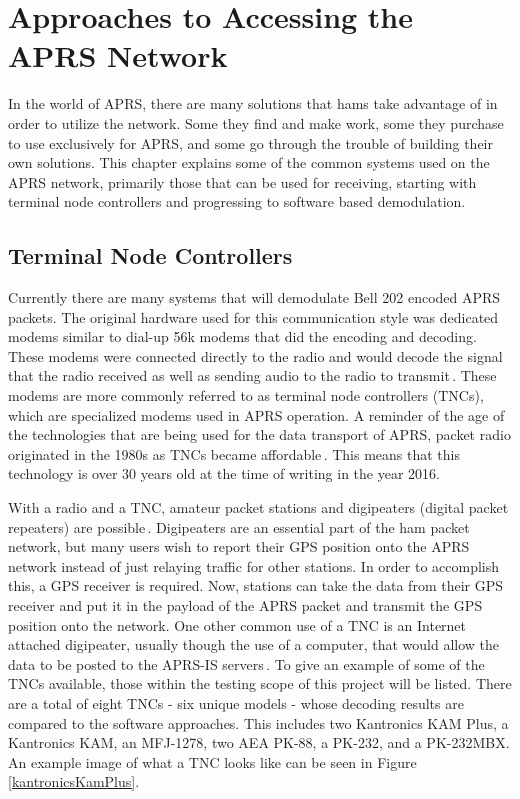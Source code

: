 \chapter{Approaches to Accessing the APRS Network}
In the world of APRS, there are many solutions that hams take advantage of in order to utilize the network. Some they find and make work, some they purchase to use exclusively for APRS, and some go through the trouble of building their own solutions. This chapter explains some of the common systems used on the APRS network, primarily those that can be used for receiving, starting with terminal node controllers and progressing to software based demodulation.

\section{Terminal Node Controllers}
Currently there are many systems that will demodulate Bell 202 encoded APRS packets. The original hardware used for this communication style was dedicated modems similar to dial-up 56k modems that did the encoding and decoding. These modems were connected directly to the radio and would decode the signal that the radio received as well as sending audio to the radio to transmit\,\cite{Wolfgang2005}. These modems are more commonly referred to as terminal node controllers (TNCs), which are specialized modems used in APRS operation. A reminder of the age of the technologies that are being used for the data transport of APRS, packet radio originated in the 1980s as TNCs became affordable\,\cite{Helms1992}. This means that this technology is over 30 years old at the time of writing in the year 2016.

With a radio and a TNC, amateur packet stations and digipeaters (digital packet repeaters) are possible\,\cite{Group2012,Wiki2012}. Digipeaters are an essential part of the ham packet network, but many users wish to report their GPS position onto the APRS network instead of just relaying traffic for other stations. In order to accomplish this, a GPS receiver is required. Now, stations can take the data from their GPS receiver and put it in the payload of the APRS packet and transmit the GPS position onto the network. One other common use of a TNC is an Internet attached digipeater, usually though the use of a computer, that would allow the data to be posted to the APRS-IS servers\,\cite{Community2015}. To give an example of some of the TNCs available, those within the testing scope of this project will be listed. There are a total of eight TNCs - six unique models - whose decoding results are compared to the software approaches. This includes two Kantronics KAM Plus, a Kantronics KAM, an MFJ-1278, two AEA PK-88, a PK-232, and a PK-232MBX. An example image of what a TNC looks like can be seen in Figure \ref{kantronicsKamPlus}.


